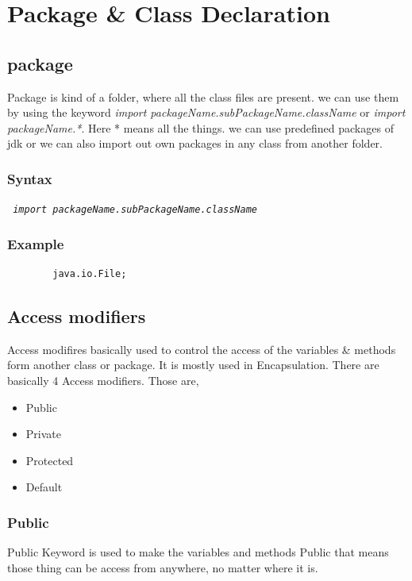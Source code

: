 \documentclass[A4 paper,openany]{book}  %
\begin{document}
% 
% 
\chapter{Package \& Class Declaration}

% 
% 
\section{package}
Package is kind of a folder, where all the class files are present. we can use them by using the keyword \textit{import packageName.subPackageName.className} or
\textit{import packageName.*}. Here * means all the things. we can use predefined packages of jdk or we can also import out own packages in any class from another folder.
% 
% 
\subsection{Syntax}
\begin{center}
    \tt{
        \textit{import packageName.subPackageName.className}
    }
\end{center}
% 
% 
\subsection{Example}
\begin{center}
    \begin{verbatim}
        java.io.File;
    \end{verbatim}
\end{center}

% 
% 
\section{Access modifiers}
Access modifires basically used to control the access of the variables \& methods form another class or package. It is mostly used in Encapsulation.
There are basically 4 Access modifiers. Those are,
\begin{itemize}
    \item Public
    \item Private
    \item Protected
    \item Default
\end{itemize}
% 
%
\subsection{Public}
Public Keyword is used to make the variables and methods Public that means those thing can be access from anywhere, no matter where it is.
% 
%
\end{document}
